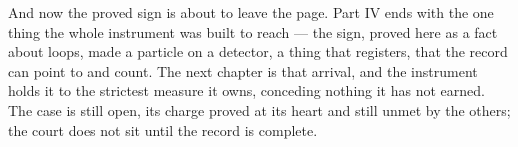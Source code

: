 And now the proved sign is about to leave the page. Part IV ends with the one thing the whole instrument was
built to reach --- the sign, proved here as a fact about loops, made a particle on a detector, a thing that
registers, that the record can point to and count. The next chapter is that arrival, and the instrument holds it
to the strictest measure it owns, conceding nothing it has not earned. The case is still open, its charge proved
at its heart and still unmet by the others; the court does not sit until the record is complete.
